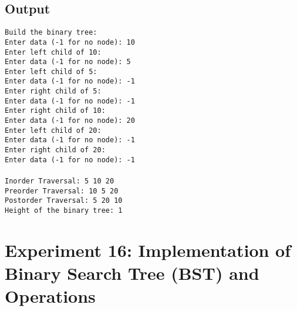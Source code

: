 \documentclass[12pt,a4paper]{article}
\begin{document}
\subsection*{Output}
\begin{tcolorbox}[terminalstyle, title=Sample Output]
\texttt{Build the binary tree: \\
Enter data (-1 for no node): 10 \\
Enter left child of 10:\\
Enter data (-1 for no node): 5 \\
Enter left child of 5:\\
Enter data (-1 for no node): -1 \\
Enter right child of 5:\\
Enter data (-1 for no node): -1 \\
Enter right child of 10:\\
Enter data (-1 for no node): 20 \\
Enter left child of 20:\\
Enter data (-1 for no node): -1 \\
Enter right child of 20:\\
Enter data (-1 for no node): -1 \\
\\
Inorder Traversal: 5 10 20\\
Preorder Traversal: 10 5 20\\
Postorder Traversal: 5 20 10\\
Height of the binary tree: 1}
\end{tcolorbox}

\newpage
\section*{Experiment 16: Implementation of Binary Search Tree (BST) and Operations}
\end{document}
